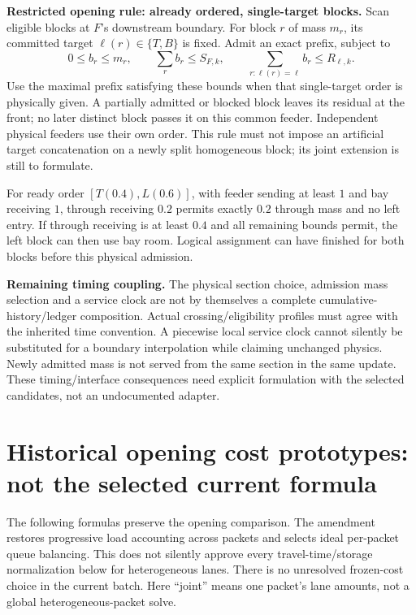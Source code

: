 \documentclass[11pt]{article}
\begin{document}
\textbf{Restricted opening rule: already ordered, single-target blocks.} Scan eligible blocks at $F$'s downstream boundary. For block $r$ of mass $m_r$, its committed target $\ell(r)\in\{T,B\}$ is fixed. Admit an exact prefix, subject to
\begin{equation}
 0\le b_r\le m_r,\qquad
 \sum_r b_r\le S_{F,k},\qquad
 \sum_{r:\ell(r)=\ell}b_r\le R_{\ell,k}.
 \label{eq:admission}
\end{equation}
Use the maximal prefix satisfying these bounds when that single-target order is physically given. A partially admitted or blocked block leaves its residual at the front; no later distinct block passes it on this common feeder. Independent physical feeders use their own order. This rule must not impose an artificial target concatenation on a newly split homogeneous block; its joint extension is still to formulate.

For ready order $[T(0.4),L(0.6)]$, with feeder sending at least $1$ and bay receiving $1$, through receiving $0.2$ permits exactly $0.2$ through mass and no left entry. If through receiving is at least $0.4$ and all remaining bounds permit, the left block can then use bay room. Logical assignment can have finished for both blocks before this physical admission.

\textbf{Remaining timing coupling.} The physical section choice, admission mass selection and a service clock are not by themselves a complete cumulative-history/ledger composition. Actual crossing/eligibility profiles must agree with the inherited time convention. A piecewise local service clock cannot silently be substituted for a boundary interpolation while claiming unchanged physics. Newly admitted mass is not served from the same section in the same update. These timing/interface consequences need explicit formulation with the selected candidates, not an undocumented adapter.

\section*{Historical opening cost prototypes: not the selected current formula}

The following formulas preserve the opening comparison. The amendment restores progressive load accounting across packets and selects ideal per-packet queue balancing. This does not silently approve every travel-time/storage normalization below for heterogeneous lanes. There is no unresolved frozen-cost choice in the current batch. Here ``joint'' means one packet's lane amounts, not a global heterogeneous-packet solve.
\end{document}
